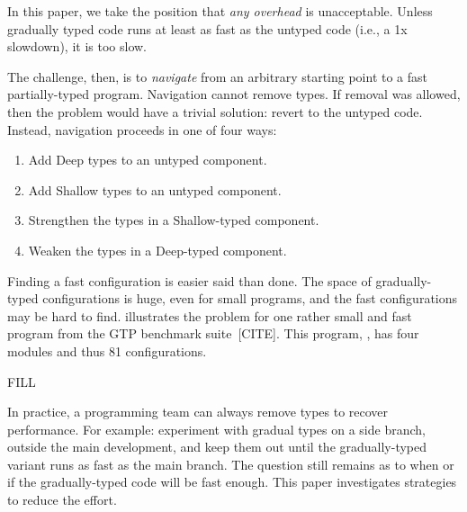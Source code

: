 In this paper, we take the position that \emph{any overhead} is unacceptable.
Unless gradually typed code runs at least as fast as the untyped code
(i.e., a 1x slowdown), it is too slow.

The challenge, then, is to \emph{navigate} from an arbitrary starting point
to a fast partially-typed program.
Navigation cannot remove types.
If removal was allowed, then the problem would have a trivial solution: revert
to the untyped code.
Instead, navigation proceeds in one of four ways:
\begin{enumerate}
  \item
    Add Deep types to an untyped component.
  \item
    Add Shallow types to an untyped component.
  \item
    Strengthen the types in a Shallow-typed component.
  \item
    Weaken the types in a Deep-typed component.
\end{enumerate}

Finding a fast configuration is easier said than done.
The space of gradually-typed configurations is huge, even for
small programs, and the fast configurations may be hard to find.
 illustrates the problem for one
rather small and fast program from the GTP benchmark suite~[CITE].
This program, , has four modules and thus 81 configurations.

FILL


In practice, a programming team can always remove types to recover performance.
For example: experiment with gradual types on a side branch, outside the main
development, and keep them out until the gradually-typed variant runs as fast
as the main branch.
The question still remains as to when or if the gradually-typed code will be
fast enough.
This paper investigates strategies to reduce the effort.


